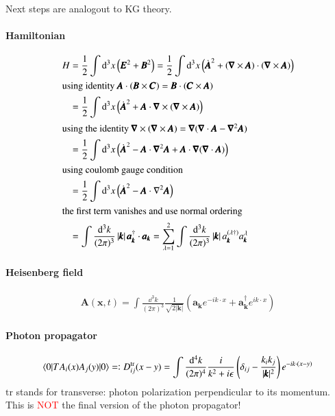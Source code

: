 Next steps are analogout to KG theory. 
\paragraph{Hamiltonian}
\begin{align*}
	H &= \frac{1}{2} \int \dd^3 x \left(\pmb{E}^2 + \pmb{B}^2 \right)= \frac{1}{2} \int \dd^3 x \left( \dot{\pmb{A}}^2 + (\pmb{\nabla} \times \pmb{A})\cdot (\pmb{\nabla} \times \pmb{A}) \right) \\
	\shortintertext{using identity $\pmb{A}\cdot(\pmb{B}\times\pmb{C}) = \pmb{B}\cdot(\pmb{C}\times\pmb{A})$}
	  &= \frac{1}{2} \int \dd^3 x \left( \dot{\pmb{A}}^2 + \pmb{A}\cdot\pmb{\nabla}\times(\pmb{\nabla} \times \pmb{A})\right) \\
	  \shortintertext{using the identity $\pmb{\nabla}\times(\pmb{\nabla}\times\pmb{A}) = \pmb{\nabla}(\pmb{\nabla}\cdot\pmb{A} - \pmb{\nabla}^2\pmb{A})$}
	  &= \frac{1}{2} \int \dd^3 x \left( \dot{\pmb{A}}^2 -\pmb{A}\cdot\pmb{\nabla}^2\pmb{A}+\pmb{A}\cdot\pmb{\nabla}(\pmb{\nabla}\cdot\pmb{A})  \right) \\
	\shortintertext{using coulomb gauge condition}
	  &= \frac{1}{2} \int \dd^3 x \left( \dot{\pmb{A}}^2 - \pmb{A}\cdot \nabla^2\pmb{A} \right) \\
	  \shortintertext{the first term vanishes and use normal ordering}
	  &= \int \frac{\dd^3 k}{(2\pi)^3} \left|\pmb{k} \right| \pmb{a}_{\pmb{k}}^\dagger \cdot \pmb{a}_{\pmb{k}} = \sum_{\lambda=1}^2 \int \frac{\dd^3 k}{(2\pi)^3} \left|\pmb{k} \right| a_{\pmb{k}}^{(\lambda \dagger)} a_{\pmb{k}}^{\lambda}
\end{align*} 

\paragraph{Heisenberg field}
\begin{align*}
	\pmb{A}(\pmb{x},t) = \int \frac{\dd^3 k}{(2\pi)^3}\frac{1}{\sqrt{2|\pmb{k}|}} \left( \pmb{a}_{\pmb{k}} e^{-ik\cdot x} +  \pmb{a}_{\pmb{k}}^\dagger e^{ik\cdot x}\right)
\end{align*}

\paragraph{Photon propagator}
\begin{align}
	\braket{0 | T A_i (x) A_j (y) | 0} = \vcentcolon D^{\text{tr}}_{ij} (x-y) = \int\frac{\dd^4 k}{(2\pi)^4}	
\frac{i}{k^2 + i\epsilon} \left( \delta_{ij} - \frac{k_i k_j}{|\pmb{k}|^2} \right)e^{-ik\cdot(x-y)}
\end{align}
$\text{tr}$ stands for transverse: photon polarization perpendicular to its momentum. This is \textcolor{red}{NOT} the final version of the photon propagator!

